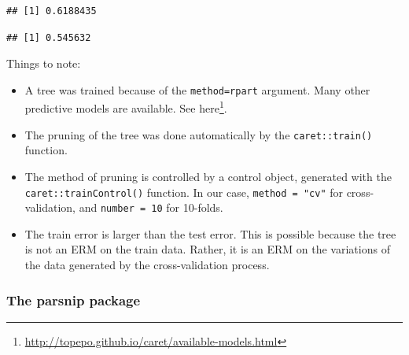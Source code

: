 \documentclass[]{book}
\newenvironment{Shaded}{\begin{snugshade}}{\end{snugshade}}
\newcommand{\CommentTok}[1]{\textcolor[rgb]{0.56,0.35,0.01}{\textit{#1}}}
\newcommand{\DataTypeTok}[1]{\textcolor[rgb]{0.13,0.29,0.53}{#1}}
\newcommand{\FloatTok}[1]{\textcolor[rgb]{0.00,0.00,0.81}{#1}}
\newcommand{\KeywordTok}[1]{\textcolor[rgb]{0.13,0.29,0.53}{\textbf{#1}}}
\newcommand{\NormalTok}[1]{#1}
\newcommand{\OperatorTok}[1]{\textcolor[rgb]{0.81,0.36,0.00}{\textbf{#1}}}
\newcommand{\StringTok}[1]{\textcolor[rgb]{0.31,0.60,0.02}{#1}}
\providecommand{\tightlist}{%
  \setlength{\itemsep}{0pt}\setlength{\parskip}{0pt}}
\renewcommand{\href}[2]{#2\footnote{\url{#1}}}
\theoremstyle{definition}
\theoremstyle{definition}
\theoremstyle{definition}
\theoremstyle{remark}
\begin{document}
\begin{Shaded}
\end{Shaded}

\begin{verbatim}
## [1] 0.6188435
\end{verbatim}

\begin{Shaded}
\end{Shaded}

\begin{verbatim}
## [1] 0.545632
\end{verbatim}

Things to note:

\begin{itemize}
\tightlist
\item
  A tree was trained because of the \texttt{method=\textquotesingle{}rpart\textquotesingle{}} argument. Many other predictive models are available. See \href{http://topepo.github.io/caret/available-models.html}{here}.
\item
  The pruning of the tree was done automatically by the \texttt{caret::train()} function.
\item
  The method of pruning is controlled by a control object, generated with the \texttt{caret::trainControl()} function. In our case, \texttt{method\ =\ "cv"} for cross-validation, and \texttt{number\ =\ 10} for 10-folds.
\item
  The train error is larger than the test error. This is possible because the tree is not an ERM on the train data. Rather, it is an ERM on the variations of the data generated by the cross-validation process.
\end{itemize}

\hypertarget{parsnip}{%
\subsubsection{The parsnip package}\label{parsnip}}
\end{document}
